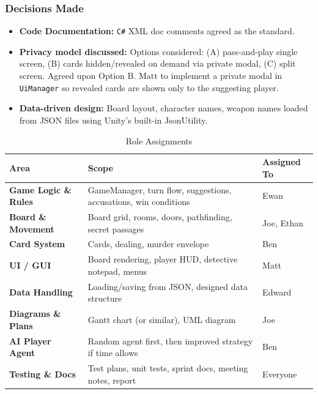 \subsubsection*{Decisions Made}

\begin{itemize}
    \item\textbf{Code Documentation:} \texttt{C\#} XML doc comments agreed as the standard.
    \item\textbf{Privacy model discussed:} Options considered: (A) pass-and-play single screen, (B) cards hidden/revealed on demand via private modal, (C) split screen. Agreed upon Option B. Matt to implement a private modal in \texttt{UiManager} so revealed cards are shown only to the suggesting player.
    \item\textbf{Data-driven design:} Board layout, character names, weapon names loaded from JSON files using Unity's built-in JsonUtility.
\end{itemize}

\begin{table}[H]
\centering
\caption*{Role Assignments}
\begin{tabular}{|p{4cm}|p{3cm}|p{2.2cm}|}
\hline
\textbf{Area} & \textbf{Scope} & \textbf{Assigned To} \\ \hline
\textbf{Game Logic \& Rules} & GameManager, turn flow, suggestions, accusations, win conditions & Ewan \\ \hline
\textbf{Board \& Movement} & Board grid, rooms, doors, pathfinding, secret passages & Joe, Ethan \\ \hline
\textbf{Card System} & Cards, dealing, murder envelope & Ben \\ \hline
\textbf{UI / GUI} & Board rendering, player HUD, detective notepad, menus & Matt \\ \hline
\textbf{Data Handling} & Loading/saving from JSON, designed data structure & Edward \\ \hline
\textbf{Diagrams \& Plans} & Gantt chart (or similar), UML diagram & Joe \\ \hline
\textbf{AI Player Agent} & Random agent first, then improved strategy if time allows & Ben \\ \hline
\textbf{Testing \& Docs} & Test plans, unit tests, sprint docs, meeting notes, report & Everyone \\ \hline
\end{tabular}
\end{table}

